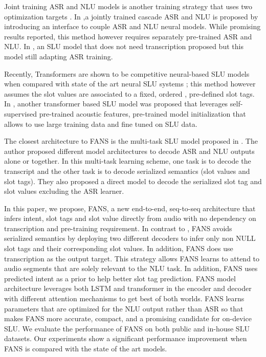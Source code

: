 \documentclass[a4paper]{article}
\begin{document}
 Joint training ASR and NLU models is another training strategy that uses two optimization targets  \cite{1910.11559}.   In \cite{rao2020speech} ,a jointly trained cascade ASR and NLU is proposed by introducing an interface to couple ASR and NLU neural models. While promising results reported, this  method however requires separately pre-trained ASR and NLU.  In \cite{kuo2020end}, an SLU model that does not need  transcription proposed  but this model  still  adapting ASR training. 


Recently, Transformers are shown  to be competitive neural-based SLU models when compared with state of the art neural SLU systems \cite{martinInterspeech2020};  this method however assumes the slot values are associated to a fixed, ordered , pre-defined slot tags. In \cite{morais2020end}, another transformer based SLU model  was proposed that leverages self-supervised pre-trained acoustic features, pre-trained model initialization that allows to use large training data and fine tuned on SLU data.

The closest architecture to FANS is  the multi-task SLU model proposed in  \cite{haghani2018audio}. The author proposed different model architectures to decode  ASR and NLU outputs  alone or together. In this multi-task learning scheme, one task is to decode the transcript and the other task is to decode serialized semantics (slot values and slot tags). They also proposed a direct model to decode the serialized slot tag and slot values excluding the ASR learner.

In this paper, we propose, FANS, a new end-to-end, seq-to-seq  architecture that infers intent, slot tags and slot value directly from audio with no dependency on transcription and  pre-training requirement. In contrast to  \cite{haghani2018audio}, FANS avoids serialized semantics by deploying two different decoders  to infer only non NULL slot tags and their corresponding slot values. In addition, FANS does use transcription as the output target. This strategy allows FANS learns to attend to  audio segments that are  solely relevant to the NLU task. In addition, FANS uses predicted intent as a prior to help better slot tag prediction. FANS model architecture leverages both LSTM and transformer in the encoder and decoder with different attention mechanisms to get best of both worlds. FANS learns parameters that are optimized for the NLU output rather than ASR so that makes FANS more accurate, compact, and a promising candidate for on-device SLU. We evaluate the performance of FANS on both public and in-house SLU datasets. Our experiments show a significant performance improvement when FANS is compared with the state of the art models. 
 
\end{document}
